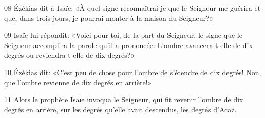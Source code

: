 
08 Ézékias dit à Isaïe: «À quel signe reconnaîtrai-je que le Seigneur me guérira et que, dans trois jours, je pourrai monter à la maison du Seigneur?»

09 Isaïe lui répondit: «Voici pour toi, de la part du Seigneur, le signe que le Seigneur accomplira la parole qu’il a prononcée: L’ombre avancera-t-elle de dix degrés ou reviendra-t-elle de dix degrés?»

10 Ézékias dit: «C’est peu de chose pour l’ombre de s’étendre de dix degrés! Non, que l’ombre revienne de dix degrés en arrière!»

11 Alors le prophète Isaïe invoqua le Seigneur, qui fit revenir l’ombre de dix degrés en arrière, sur les degrés qu’elle avait descendus, les degrés d’Acaz.